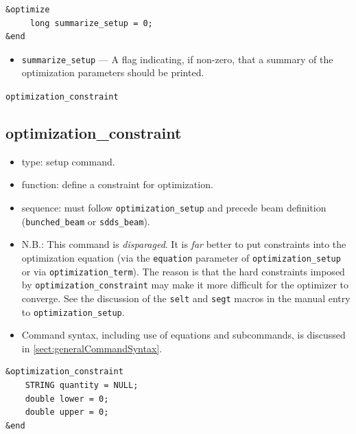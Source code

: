 \documentclass[11pt]{article}
\begin{document}
\begin{verbatim}
&optimize
     long summarize_setup = 0;
&end
\end{verbatim}

\begin{itemize}

\item \verb|summarize_setup| --- A flag indicating, if non-zero, that a
summary of the optimization parameters should be printed.
\end{itemize}

\newpage
\begin{center}{\Large\verb|optimization_constraint|}\end{center}
\subsection{optimization\_constraint \label{subsec:optimizationconstraint}}

\begin{itemize}
\item type: setup command.
\item function: define a constraint for optimization.
\item sequence: must follow \verb|optimization_setup| and precede beam definition (\verb|bunched_beam| or \verb|sdds_beam|).
\item N.B.: This command is {\em disparaged}. It is {\em far} better to put constraints
	into the optimization equation (via the \verb|equation| parameter of
	\verb|optimization_setup| or via \verb|optimization_term|).  The reason
	is that the hard constraints imposed by \verb|optimization_constraint|
	may make it more difficult for the optimizer to converge.  See the discussion of the
        \verb|selt| and \verb|segt| macros in the manual entry to \verb|optimization_setup|.
\item Command syntax, including use of equations and subcommands, is discussed in \ref{sect:generalCommandSyntax}.
\end{itemize}

\begin{verbatim}
&optimization_constraint
    STRING quantity = NULL;
    double lower = 0;
    double upper = 0;
&end
\end{verbatim}
\end{document}
